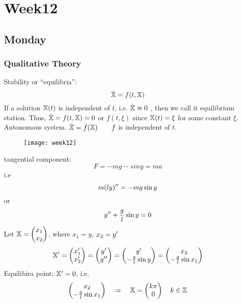 \chapter{Week12}

\section{Monday}
\subsection{Qualitative Theory}
Stability or ``equilibria'':
\[\dot{\mathbb{X}}=f(t,\mathbb{X})
\]
If a solution $\mathbb{X}(t)$ is independent of $t$, i.e. $\dot{\mathbb{X}}\equiv0$ , then we call it equilibrium station. Thus, $\dot{\mathbb{X}}=f(t,\mathbb{X})=0$ or $f(t,\xi)$ since $\mathbb{X}(t)=\xi$ for some constant $\xi$.\\
Autonomous system. $\dot{\mathbb{X}}=f(\mathbb{X})\qquad f$ is independent of $t$.
\begin{example}
\begin{figure}[H]
\centering
\texttt{[image: week12]}
\end{figure}
tangential component:
\[F=-mg-siny=ma
\]
i.e
\[m(ly)^{\prime\prime}=-mg\sin y
\]
or
\[y^{\prime\prime}+\frac{g}{l}\sin y=0
\]
Let $\mathbb{X}=\begin{pmatrix}x_1\\x_2\end{pmatrix}$, where $x_1=y$, $x_2=y^{\prime}$
\[\mathbb{X}^{\prime}=\begin{pmatrix}x_1^{\prime}\\x_2^{\prime}\end{pmatrix}=\begin{pmatrix}y^{\prime}\\y^{\prime\prime}\end{pmatrix}=\begin{pmatrix}y^{\prime}\\-\frac{g}{l}\sin y\end{pmatrix}=\begin{pmatrix}x_2\\-\frac{g}{l}\sin x_1\end{pmatrix}
\]
Equilibira point: $\mathbb{X}^{\prime}=0$, i.e. \[\begin{pmatrix}x_2\\-\frac{g}{l}\sin x_1\end{pmatrix}\quad\Rightarrow\quad \mathbb{X}=\begin{pmatrix}k\pi\\0\end{pmatrix}\quad k\in\mathbb{Z}
\]
\end{example}
